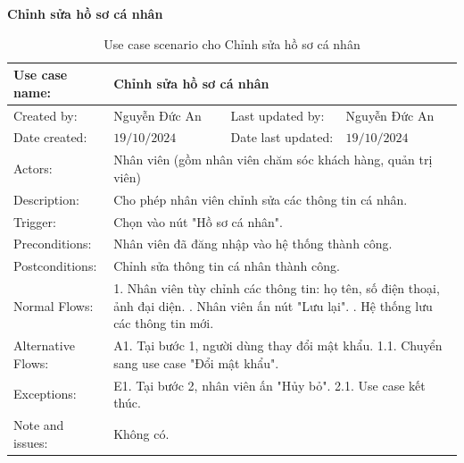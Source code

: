 \textbf{Chỉnh sửa hồ sơ cá nhân}
\begin{table}[H]
	\centering
	\begin{tabular}{|l|l|l|l|} 
		\hline Use case name: & \multicolumn{3}{|l|}{Chỉnh sửa hồ sơ cá nhân} \\ 
		\hline Created by: & Nguyễn Đức An & Last updated by: & Nguyễn Đức An \\ 
		\hline Date created: & $19 / 10 / 2024$ & Date last updated: & $19 / 10 / 2024$\\ 
		\hline Actors: & \multicolumn{3}{|p{12cm}|}{Nhân viên (gồm nhân viên chăm sóc khách hàng, quản trị viên)} \\ 
		\hline Description: & \multicolumn{3}{|p{12cm}|}{ Cho phép nhân viên chỉnh sửa các thông tin cá nhân. } \\ 
		\hline Trigger: & \multicolumn{3}{|p{12cm}|}{ Chọn vào nút "Hồ sơ cá nhân". } \\ 
		\hline Preconditions: & \multicolumn{3}{|p{12cm}|}{ Nhân viên đã đăng nhập vào hệ thống thành công. } \\ 
		\hline Postconditions: & \multicolumn{3}{|p{12cm}|}{ Chỉnh sửa thông tin cá nhân thành công. } \\ 
		\hline Normal Flows: & \multicolumn{3}{|p{12cm}|}{ 
			1. Nhân viên tùy chỉnh các thông tin: họ tên, số điện thoại, ảnh đại diện. \newline 
			2. Nhân viên ấn nút "Lưu lại". \newline 
			3. Hệ thống lưu các thông tin mới. 
		} \\ 
		\hline Alternative Flows: & \multicolumn{3}{|p{12cm}|}{ 
			A1. Tại bước 1, người dùng thay đổi mật khẩu. \newline 
			\hspace{0.5cm}1.1. Chuyển sang use case "Đổi mật khẩu". 
		} \\ 
		\hline Exceptions: & \multicolumn{3}{|p{12cm}|}{ 
			E1. Tại bước 2, nhân viên ấn "Hủy bỏ". \newline 
			\hspace{0.5cm}2.1. Use case kết thúc. 
		} \\ 
		\hline Note and issues: & \multicolumn{3}{|p{12cm}|}{ Không có. } \\ 
		\hline
	\end{tabular}
	\caption{Use case scenario cho Chỉnh sửa hồ sơ cá nhân}
\end{table}


